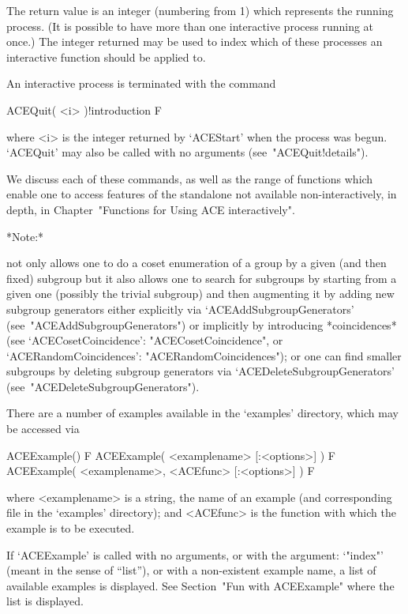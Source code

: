The return value is an integer (numbering from 1) which represents the
running process. (It is possible to have  more  than  one  interactive
process running at once.) The integer returned may be  used  to  index
which of these processes an  interactive  {\ACE}  function  should  be
applied to.

An interactive {\ACE} process is terminated with the command

\>ACEQuit( <i> )!{introduction} F

where <i> is the integer returned by `ACEStart' when the  process  was
begun.   `ACEQuit'   may   also   be   called   with   no    arguments
(see~"ACEQuit!details").

We discuss each of these commands, as well as the range  of  functions
which enable one to access  features  of  the  {\ACE}  standalone  not
available non-interactively, in depth, in Chapter~"Functions for Using
ACE interactively".

*Note:*

{\ACE} not only allows one to do a coset enumeration of a group  by  a
given (and then fixed) subgroup but it also allows one to  search  for
subgroups by starting from a given one (possibly the trivial subgroup)
and then augmenting  it  by  adding  new  subgroup  generators  either
explicitly               via                `ACEAddSubgroupGenerators'
(see~"ACEAddSubgroupGenerators")   or   implicitly   by    introducing
*coincidences* (see `ACECosetCoincidence':  "ACECosetCoincidence",  or
`ACERandomCoincidences': "ACERandomCoincidences");  or  one  can  find
smaller   subgroups    by    deleting    subgroup    generators    via
`ACEDeleteSubgroupGenerators' (see~"ACEDeleteSubgroupGenerators").


There are a number of examples available in the `examples'  directory,
which may be accessed via

\>ACEExample() F
\>ACEExample( <examplename> [:<options>] ) F
\>ACEExample( <examplename>, <ACEfunc> [:<options>] ) F

where  <examplename>  is  a  string,  the  name  of  an  example  (and
corresponding file in the `examples' directory); and <ACEfunc> is  the
{\ACE} function with which the example is to be executed. 

If `ACEExample' is called with no arguments,  or  with  the  argument:
`"index"' (meant in the sense of ``list''),  or  with  a  non-existent
example  name,  a  list  of  available  examples  is  displayed.   See
Section~"Fun with ACEExample" where the list is displayed.

